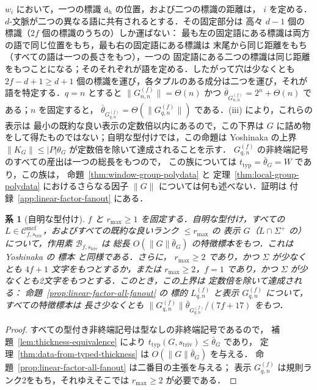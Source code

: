 \documentclass[11pt,a4paper]{ltjsarticle}
\numberwithin{equation}{section}
\theoremstyle{plain}
\newtheorem{corollary}[theorem]{系}
\theoremstyle{definition}
\theoremstyle{remark}
\newcommand{\Cmcf}[2]{\mathcal{C}^{\mathrm{mcf}}_{#1,#2}}
\theoremstyle{plain}
\begin{document}
$w_i$ において，一つの標識 $\mathtt d_h$ の位置，および二つの標識の距離は，
$i$ を定める．$d$-文脈が二つの異なる語に共有されるとする．その固定部分は
高々 $d-1$ 個の標識（$2f$ 個の標識のうちの）しか運ばない：
最も左の固定語にある標識は両方の語で同じ位置をもち，最も右の固定語にある標識は
末尾から同じ距離をもち（すべての語は一つの長さをもつ），一つの
固定語にある二つの標識は同じ距離をもつことになる；そのそれぞれが語を定める．したがって穴は少なくとも
$2f-d+1\ge d+1$ 個の標識を運び，各タプルのある成分は二つを運び，それが
語を特定する．$q=n$ とすると $\|G^{(f)}_{n,n}\|=\Theta(n)$ かつ
$\bar\theta_{G^{(f)}_{n,n}}=2^n+\Theta(n)$ である；$n$ を固定すると，
$\bar\theta_{G^{(f)}_{q,n}}=\Theta(\|G^{(f)}_{q,n}\|)$ である．(iii) により，これらの表示は
最小の既約な良い表示の定数倍以内にあるので，この下界は
$G$ に詰め物をして得たものではない；自明な型付けでは，この命題は
Yoshinaka の上界 $\|K_G\|\le|P|\theta_G$ が定数倍を除いて達成されることを示す．
$G^{(f)}_{q,n}$ の非終端記号のすべての産出は一つの総長をもつので，
この族については $t_{\mathrm{typ}}=\bar\theta_G=W$ であり，この族は，
命題~\ref{thm:window-group-polydata} と
定理~\ref{thm:local-group-polydata} におけるさらなる因子 $\|G\|$ については何も述べない．証明は
付録~\ref{app:linear-factor-fanout} にある．

\begin{corollary}[自明な型付け]
\label{cor:trivial-exact}
$f$ と $r_{\max}\ge1$ を固定する．自明な型付け，すべての
$L\in\Cmcf{f}{s_{\mathrm{triv}}}$，およびすべての既約な良いランク $\le r_{\max}$ の
表示 $G$（$L\cap\Sigma^+$ の）について，作用素 $\mathcal B_{f,s_{\mathrm{triv}}}$ は
総長 $O(\|G\|\bar\theta_G)$ の特徴標本をもつ．これは Yoshinaka の
標本 \cite[Lemma~7 and Theorem~1]{Yoshinaka2011} と同様である．さらに，
$r_{\max}\ge2$ であり，かつ $\Sigma$ が少なくとも $4f+1$ 文字をもつとするか，または
$r_{\max}\ge2$，$f=1$ であり，かつ $\Sigma$ が少なくとも2文字をもつとする．このとき，この上界は
定数倍を除いて達成される：
命題~\ref{prop:linear-factor-all-fanout} の
標的 $L^{(f)}_{q,n}$ と表示 $G^{(f)}_{q,n}$ について，すべての特徴標本は
長さ少なくとも $\|G^{(f)}_{q,n}\|\bar\theta_{G^{(f)}_{q,n}}/(7f+17)$ をもつ．
\end{corollary}

\begin{proof}
すべての型付き非終端記号は型なしの非終端記号であるので，
補題~\ref{lem:thickness-equivalence} により $t_{\mathrm{typ}}(G,s_{\mathrm{triv}})\le\bar\theta_G$ であり，
定理~\ref{thm:data-from-typed-thickness} は $O(\|G\|\bar\theta_G)$ を与える．
命題~\ref{prop:linear-factor-all-fanout} は二番目の主張を与える；
表示 $G^{(f)}_{q,n}$ は規則ランク2をもち，それゆえそこでは
$r_{\max}\ge2$ が必要である．
\end{proof}
\end{document}
